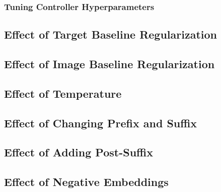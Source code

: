 \label{sec:sgw-hyperparameters}


\label{sec:tangram-hyperparameters}


\subsubsection{Tuning Controller Hyperparameters}
\label{sec:icem-hyperparameters}


\subsection{Effect of Target Baseline Regularization}
\label{sec:reg-alpha}


\subsection{Effect of Image Baseline Regularization}
\label{sec:reg-beta}


\subsection{Effect of Temperature}
\label{sec:reg-temperature}


\subsection{Effect of Changing Prefix and Suffix}
\label{sec:prefix-suffix}


\subsection{Effect of Adding Post-Suffix}
\label{sec:post-suffix}


\subsection{Effect of Negative Embeddings}
\label{sec:negative-embeddings}


